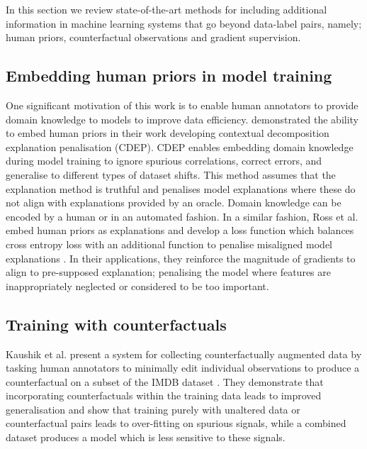 



In this section we review state-of-the-art methods for including additional information in machine learning systems that go beyond data-label pairs, namely; human priors, counterfactual observations and gradient supervision.

\subsection{Embedding human priors in model training}
One significant motivation of this work is to enable human annotators to provide domain knowledge to models to improve data efficiency. \citeauthor{rieger2020interpretations} \cite{rieger2020interpretations} demonstrated the ability to embed human priors in their work developing contextual decomposition explanation penalisation (CDEP). CDEP enables embedding domain knowledge during model training to ignore spurious correlations, correct errors, and generalise to different types of dataset shifts. This method assumes that the explanation method is truthful and penalises model explanations where these do not align with explanations provided by an oracle. Domain knowledge can be encoded by a human or in an automated fashion. In a similar fashion, Ross et al. embed human priors as explanations and develop a loss function which balances cross entropy loss with an additional function to penalise misaligned model explanations \cite{ross2017right}. In their applications, they reinforce the magnitude of gradients to align to pre-supposed explanation; penalising the model where features are inappropriately neglected or considered to be too important.

\subsection{Training with counterfactuals}
Kaushik et al. \cite{Kaushik2020Learning} present a system for collecting counterfactually augmented data by tasking human annotators to minimally edit individual observations to produce a counterfactual on a subset of the IMDB dataset \cite{imdb}. They demonstrate that incorporating counterfactuals within the training data leads to improved generalisation and show that training purely with unaltered data or counterfactual pairs leads to over-fitting on spurious signals, while a combined dataset produces a model which is less sensitive to these signals.


